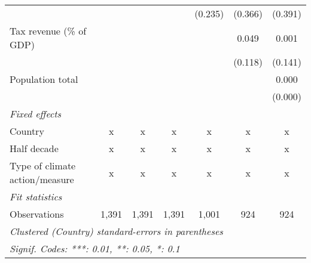 \begin{tabular}{lcccccc}
                                                               &         &         &                & (0.235)       & (0.366)       & (0.391)\\   
   Tax revenue (\% of GDP)                                     &         &         &                &               & 0.049         & 0.001\\   
                                                               &         &         &                &               & (0.118)       & (0.141)\\   
   Population total                                            &         &         &                &               &               & 0.000\\   
                                                               &         &         &                &               &               & (0.000)\\   
   \emph{Fixed effects}\\
   Country                                                     & x       & x       & x              & x             & x             & x\\  
   Half decade                                                 & x       & x       & x              & x             & x             & x\\  
   Type of climate action/measure                              & x       & x       & x              & x             & x             & x\\  
   \midrule \emph{Fit statistics}\\
   Observations                                                & 1,391   & 1,391   & 1,391          & 1,001         & 924           & 924\\  
   \midrule
   \multicolumn{7}{l}{\emph{Clustered (Country) standard-errors in parentheses}}\\
   \multicolumn{7}{l}{\emph{Signif. Codes: ***: 0.01, **: 0.05, *: 0.1}}\\
\end{tabular}
\par\endgroup



